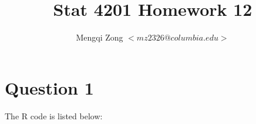 \documentclass[12pt]{article}
\title{Stat 4201 Homework 12}
\author{Mengqi Zong $<mz2326@columbia.edu>$}
\begin{document}
\maketitle

\setlength{\parindent}{0in}

\section*{Question 1}



\appendix
\appendixpage
\addappheadtotoc

The R code is listed below:


\end{document}
